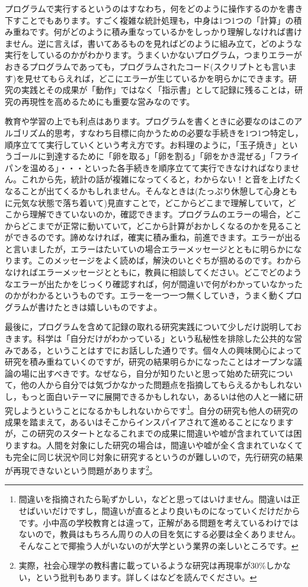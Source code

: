 \documentclass{ltjsbook}
\begin{document}
プログラムで実行するというのはすなわち，何をどのように操作するのかを書き下すことでもあります。すごく複雑な統計処理も，中身は1つ1つの「計算」の積み重ねです。何がどのように積み重なっているかをしっかり理解しなければ書けません。逆に言えば，書いてあるものを見ればどのように組み立て，どのような実行をしているのかがわかります。うまくいかないプログラム，つまりエラーがおきるプログラムであっても，プログラムされたコード(スクリプトとも言います)を見せてもらえれば，どこにエラーが生じているかを明らかにできます。研究の実践とその成果が「動作」ではなく「指示書」として記録に残ることは，研究の再現性を高めるためにも重要な営みなのです。

教育や学習の上でも利点はあります。プログラムを書くときに必要なのはこのアルゴリズム的思考，すなわち目標に向かうための必要な手続きを1つ1つ特定し，順序立てて実行していくという考え方です。お料理のように，「玉子焼き」というゴールに到達するために「卵を取る」「卵を割る」「卵をかき混ぜる」「フライパンを温める」・・・といった各手続きを順序立てて実行できなければなりません。これから先，統計の話が複雑になってくると，わからない！と音を上げたくなることが出てくるかもしれません。そんなときは(たっぷり休憩して心身ともに元気な状態で落ち着いて)見直すことで，どこからどこまで理解していて，どこから理解できていないのか，確認できます。プログラムのエラーの場合，どこからどこまでが正常に動いていて，どこから計算がおかしくなるのかを見ることができるのです。諦めなければ，確実に積み重ね，前進できます。エラーが出ると言いましたが，エラーはたいていの場合エラーメッセージとともに明らかになります。このメッセージをよく読めば，解決のいとぐちが掴めるのです。わからなければエラーメッセージとともに，教員に相談してください。どこでどのようなエラーが出たかをじっくり確認すれば，何が間違いで何がわかっていなかったのかがわかるというものです。エラーを一つ一つ無くしていき，うまく動くプログラムが書けたときは嬉しいものですよ。

最後に，プログラムを含めて記録の取れる研究実践について少しだけ説明しておきます。科学は「自分だけがわかっている」という私秘性を排除した公共的な営みである，ということはすでにお話しした通りです。個々人の興味関心によって研究を積み重ねていくのですが，研究の結果明らかになったことはオープンな議論の場に出すべきです。なぜなら，自分が知りたいと思って始めた研究について，他の人から自分では気づかなかった問題点を指摘してもらえるかもしれないし，もっと面白いテーマに展開できるかもしれない，あるいは他の人と一緒に研究しようということになるかもしれないからです\footnote{間違いを指摘されたら恥ずかしい，などと思ってはいけません。間違いは正せばいいだけですし，間違いが直るとより良いものになっていくだけだからです。小中高の学校教育とは違って，正解がある問題を考えているわけではないので，教員はもちろん周りの人の目を気にする必要は全くありません。そんなことで揶揄う人がいないのが大学という業界の楽しいところです。}。自分の研究も他人の研究の成果を踏まえて，あるいはそこからインスパイアされて進めることになりますが，この研究のスタートとなるこれまでの成果に間違いや嘘が含まれていては困りますね。人間を対象にした研究の場合は，間違いや嘘が全く含まれていなくても完全に同じ状況や同じ対象に研究するというのが難しいので，先行研究の結果が再現できないという問題があります\footnote{実際，社会心理学の教科書に載っているような研究は再現率が30\%しかない，という批判もあります。詳しくは\citet{池田2016}などを読んでください。}。
\end{document}
